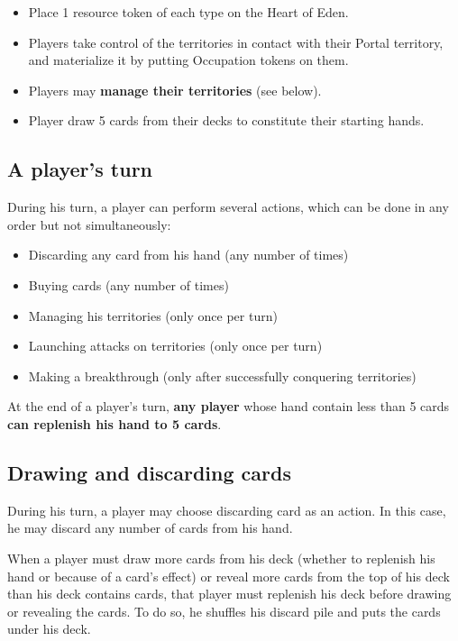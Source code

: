 \documentclass[a4paper]{article}
\begin{document}
  	\begin{itemize}
        \item Place 1 resource token of each type on the Heart of Eden.
        \item Players take control of the territories in contact with their Portal territory,
    and materialize it by putting Occupation tokens on them.
        \item Players may \textbf{manage their territories} (see below).
        \item Player draw 5 cards from their decks to constitute their starting hands.
    \end{itemize}


  \subsection{A player's turn}

    \hspace{-1.5em} During his turn, a player can perform several actions, which can be done in any order but not simultaneously:
    \vspace{-1.3em}
    \begin{itemize}
        \item Discarding any card from his hand (any number of times)
        \item Buying cards (any number of times)
        \item Managing his territories (only once per turn)
        \item Launching attacks on territories (only once per turn)
        \item Making a breakthrough (only after successfully conquering territories)
    \end{itemize}
    
    \vspace{-0.7em}
    At the end of a player's turn, \textbf{any player} whose hand contain less than 5 cards \textbf{can replenish his hand to 5 cards}.


  \subsection{Drawing and discarding cards}
    
    During his turn, a player may choose discarding card as an action.
    In this case, he may discard any number of cards from his hand.

    When a player must draw more cards from his deck
    (whether to replenish his hand or because of a card's effect)
    or reveal more cards from the top of his deck than his deck contains cards,
    that player must replenish his deck before drawing or revealing the cards.
    To do so, he shuffles his discard pile and puts the cards under his deck.
\end{document}
